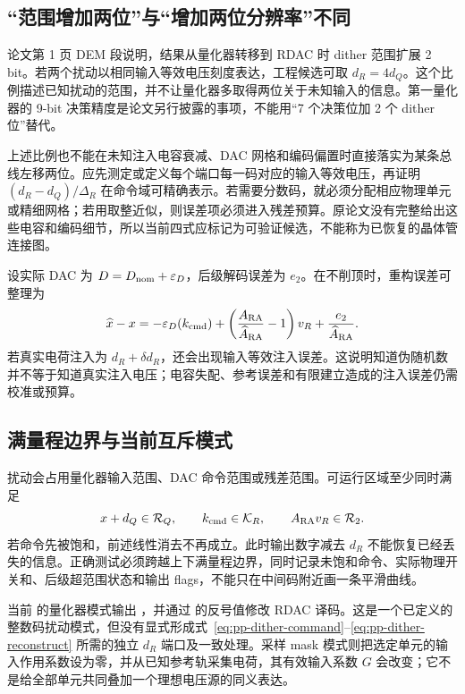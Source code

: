 \subsection{“范围增加两位”与“增加两位分辨率”不同}
论文第 1 页 DEM 段说明，结果从量化器转移到 RDAC 时 dither 范围扩展 2 bit。若两个扰动以相同输入等效电压刻度表达，工程候选可取 \(d_R=4d_Q\)。这个比例描述已知扰动的范围，并不让量化器多取得两位关于未知输入的信息。第一量化器的 9-bit 决策精度是论文另行披露的事项，不能用“7 个决策位加 2 个 dither 位”替代。

上述比例也不能在未知注入电容衰减、DAC 网格和编码偏置时直接落实为某条总线左移两位。应先测定或定义每个端口每一码对应的输入等效电压，再证明 \((d_R-d_Q)/\Delta_R\) 在命令域可精确表示。若需要分数码，就必须分配相应物理单元或精细网格；若用取整近似，则误差项必须进入残差预算。原论文没有完整给出这些电容和编码细节，所以当前四式应标记为可验证候选，不能称为已恢复的晶体管连接图。

设实际 DAC 为 \(D=D_{\rm nom}+\varepsilon_D\)，后级解码误差为 \(e_2\)。在不削顶时，重构误差可整理为
\begin{equation}
\widehat x-x=-\varepsilon_D(k_{\rm cmd})+
\left(\frac{A_{\rm RA}}{\widehat A_{\rm RA}}-1\right)v_R+
\frac{e_2}{\widehat A_{\rm RA}}.
\end{equation}
若真实电荷注入为 \(d_R+\delta d_R\)，还会出现输入等效注入误差。这说明知道伪随机数并不等于知道真实注入电压；电容失配、参考误差和有限建立造成的注入误差仍需校准或预算。

\subsection{满量程边界与当前互斥模式}
扰动会占用量化器输入范围、DAC 命令范围或残差范围。可运行区域至少同时满足
\begin{equation}
x+d_Q\in\mathcal R_Q,\qquad
k_{\rm cmd}\in\mathcal K_R,\qquad
A_{\rm RA}v_R\in\mathcal R_2.
\end{equation}
若命令先被饱和，前述线性消去不再成立。此时输出数字减去 \(d_R\) 不能恢复已经丢失的信息。正确测试必须跨越上下满量程边界，同时记录未饱和命令、实际物理开关和、后级超范围状态和输出 flags，不能只在中间码附近画一条平滑曲线。

当前  的量化器模式输出 ，并通过  的反号值修改 RDAC 译码。这是一个已定义的整数码扰动模式，但没有显式形成式~\eqref{eq:pp-dither-command}--\eqref{eq:pp-dither-reconstruct} 所需的独立 \(d_R\) 端口及一致处理。采样 mask 模式则把选定单元的输入作用系数设为零，并从已知参考轨采集电荷，其有效输入系数 \(G\) 会改变；它不是给全部单元共同叠加一个理想电压源的同义表达。

